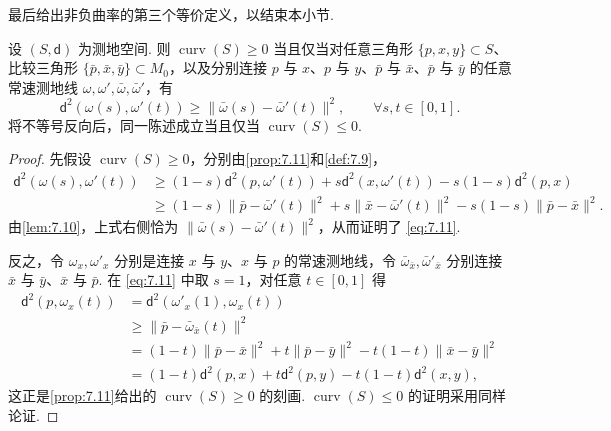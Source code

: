 最后给出非负曲率的第三个等价定义，以结束本小节.
\begin{proposition}\label{prop:7.13}
设 $(S,\mathsf d)$ 为测地空间. 则 $\operatorname{curv}(S)\ge0$ 当且仅当对任意三角形 $\{p,x,y\}\subset S$、比较三角形 $\{\bar p,\bar x,\bar y\}\subset M_0$，以及分别连接 $p$ 与 $x$、$p$ 与 $y$、$\bar p$ 与 $\bar x$、$\bar p$ 与 $\bar y$ 的任意常速测地线 $\omega,\omega',\bar\omega,\bar\omega'$，有
\begin{equation}\label{eq:7.11}
\mathsf d^2(\omega(s),\omega'(t))\ge\lVert\bar\omega(s)-\bar\omega'(t)\rVert^2,\qquad\forall s,t\in[0,1].
\end{equation}
将不等号反向后，同一陈述成立当且仅当 $\operatorname{curv}(S)\le0$.
\end{proposition}
\begin{proof}
先假设 $\operatorname{curv}(S)\ge0$，分别由\autoref{prop:7.11}和\autoref{def:7.9}，
$$\begin{aligned}
\mathsf d^2(\omega(s),\omega'(t))
&\ge(1-s)\mathsf d^2(p,\omega'(t))+s\mathsf d^2(x,\omega'(t))-s(1-s)\mathsf d^2(p,x)\\
&\ge(1-s)\lVert\bar p-\bar\omega'(t)\rVert^2+s\lVert\bar x-\bar\omega'(t)\rVert^2-s(1-s)\lVert\bar p-\bar x\rVert^2.
\end{aligned}$$
由\autoref{lem:7.10}，上式右侧恰为 $\lVert\bar\omega(s)-\bar\omega'(t)\rVert^2$，从而证明了 \eqref{eq:7.11}.

反之，令 $\omega_x,\omega'_x$ 分别是连接 $x$ 与 $y$、$x$ 与 $p$ 的常速测地线，令 $\bar\omega_{\bar x},\bar\omega'_{\bar x}$ 分别连接 $\bar x$ 与 $\bar y$、$\bar x$ 与 $\bar p$. 在 \eqref{eq:7.11} 中取 $s=1$，对任意 $t\in[0,1]$ 得
$$\begin{aligned}
\mathsf d^2(p,\omega_x(t))&=\mathsf d^2(\omega'_x(1),\omega_x(t))\\
&\ge\lVert\bar p-\bar\omega_{\bar x}(t)\rVert^2\\
&=(1-t)\lVert\bar p-\bar x\rVert^2+t\lVert\bar p-\bar y\rVert^2-t(1-t)\lVert\bar x-\bar y\rVert^2\\
&=(1-t)\mathsf d^2(p,x)+t\mathsf d^2(p,y)-t(1-t)\mathsf d^2(x,y),
\end{aligned}$$
这正是\autoref{prop:7.11}给出的 $\operatorname{curv}(S)\ge0$ 的刻画. $\operatorname{curv}(S)\le0$ 的证明采用同样论证.
\end{proof}

